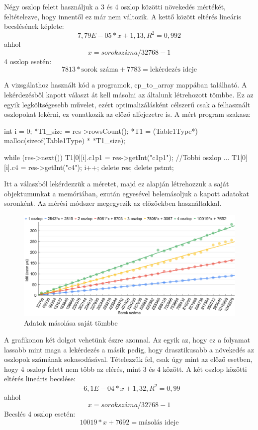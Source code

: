 Négy oszlop felett használjuk a 3 és 4 oszlop közötti növekedés mértékét, feltételezve, hogy innentől ez már nem változik. A kettő között eltérés lineáris becslésének képlete: 
$$7,79E-05*x + 1,13, R^2=0,992$$ 
ahhol
 $$x = sorok száma / 32768 - 1$$
4 oszlop esetén:
$$ 7813 * \text{sorok száma} + 7783 = \text{lekérdezés ideje}$$


A vizsgálathoz használt kód a programok, cp\_to\_array mappában található.
A lekérdezésből kapott választ át kell másolni az általunk létrehozott tömbbe. Ez az egyik legköltségesebb művelet, ezért optimalizálásként célszerű csak a felhasznált oszlopokat lekérni, ez vonatkozik az előző alfejezetre is.
A mért program szakasz:
\begin{python}
int i = 0;
*T1_size = res->rowsCount();
*T1 = (Table1Type*) malloc(sizeof(Table1Type) * *T1_size);

while (res->next())
 {
	T1[0][i].c1p1 = res->getInt("c1p1");
	//Tobbi oszlop ...
	T1[0][i].c4 = res->getInt("c4");
	i++;
 }
delete res;
delete pstmt;
\end{python}
Itt a válaszból lekérdezzük a méretet, majd ez alapján létrehozzuk a saját objektumunkat a memóriában, ezután egyesével belemásoljuk 
a kapott adatokat soronként.
Az mérési módszer megegyezik az előzőekben használtakkal.
\begin{figure}[h!]
\centering
\includegraphics[width=\textwidth]{images/graph/ccopy.png}
\caption{Adatok másolása saját tömbbe}
\label{fig:schema}
\end{figure}
A grafikonon két dolgot vehetünk észre azonnal. Az egyik az, hogy ez a folyamat lassabb mint maga a lekérdezés a másik pedig, hogy drasztikusabb a növekedés az oszlopok számának sokasodásával.
Tételezzük fel, csak úgy mint az előző esetben, hogy 4 oszlop felett nem több az elérés, mint 3 és 4 között.
A két oszlop közötti eltérés lineáris becslése:
$$-6,1E-04*x + 1,32, R^2=0,99$$ 
ahhol
 $$x = sorok száma / 32768 -1 $$
Becslés 4 oszlop esetén:
$$ 10019 * x + 7692 = \text{másolás ideje}$$

